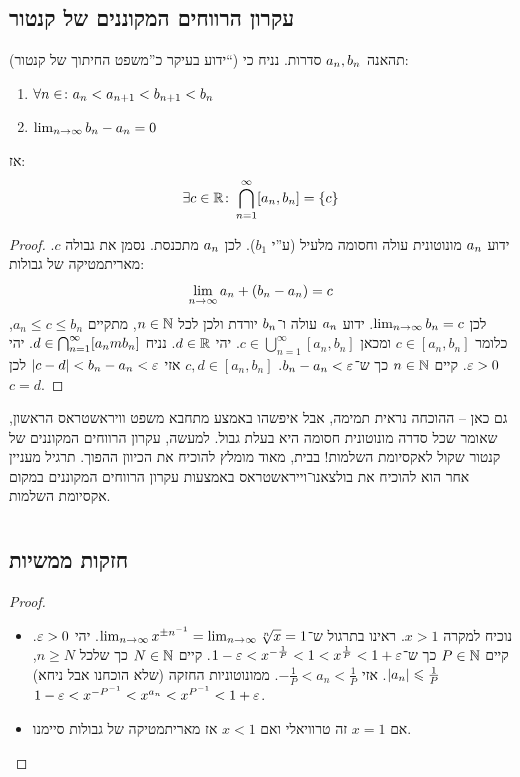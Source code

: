 \documentclass[name=רשימות חשבון דיפרנציאלי ואינטגרלי 1א]{../../../tex/classes/megasumPreamble}
\begin{document}
	\subsection{עקרון הרווחים המקוננים של קנטור}
	(ידוע בעיקר כ''משפט החיתוך של קנטור``)
	תהאנה $a_n, b_n$ סדרות. נניח כי:
	\begin{enumerate}
		\item \hfil $\forall n \in \colon a_n < a_{n + 1} < b_{n + 1} < b_n$
		\item \hfil $\lim_{n \to \infty} b_n - a_n = 0$
	\end{enumerate}
	אז:
	\[ \exists c \in \mathbb{R} \colon \bigcap_{n = 1}^{\infty}[a_n, b_n] = \{c\} \]
	\begin{proof}
		ידוע $a_n$ מונוטונית עולה וחסומה מלעיל (ע''י $b_1$). לכן $a_n$ מתכנסת. נסמן את גבולה $c$. מאריתמטיקה של גבולות:
		\[ \lim_{n \to \infty} a_n + (b_n - a_n) = c \]
		לכן $\lim_{n \to \infty} b_n = c$. ידוע $a_n$ עולה ו־$b_n$ יורדת ולכן לכל $n \in \mathbb{N}$, מתקיים $a_n \le c \le b_n$, כלומר $c \in [a_n, b_n]$ ומכאן $c \in \bigcup_{n = 1}^{\infty} [a_n, b_n]$. יהי $d \in \mathbb{R}$. נניח $d \in \bigcap_{n =1}^{\infty} [a_nm b_n]$. יהי $\eg > 0$. קיים $n \in \mathbb{N}$ כך ש־$b_n - a_n < \eg$. $c, d \in [a_n, b_n]$ אזי $\sof{c - d} < b_n - a_n < \eg$ לכן $c = d$.
	\end{proof}
	גם כאן – ההוכחה נראית תמימה, אבל איפשהו באמצע מתחבא משפט וויראשטראס הראשון, שאומר שכל סדרה מונוטונית חסומה היא בעלת גבול. למעשה, עקרון הרווחים המקוננים של קנטור שקול לאקסיומת השלמות! בבית, מאוד מומלץ להוכיח את הכיוון ההפוך. תרגיל מעניין אחר הוא להוכיח את בולצאנו־וייראשטראס באמצעות עקרון הרווחים המקוננים במקום אקסיומת השלמות.


	\section[הגדרות פונקציות אלמנטריות בעזרת התכנסות]{}
	\subsection{חזקות ממשיות}
	
	\begin{proof}\,
		\begin{itemize}
			\item נוכיח למקרה $x > 1$. ראינו בתרגול ש־$\lim_{n \to \infty} x^{\pm n^{-1}} = \lim_{n \to \infty} \sqrt[n]{x} = 1$. יהי $\eg > 0$. קיים $P \in \mathbb{N}$ כך ש־$1 - \eg < x^{-\frac{1}{P}} < 1 < x^{\frac{1}{P}} < 1 + \eg$. קיים $N \in \mathbb{N}$ כך שלכל $n \ge N$, $\left \lvert a_n \right \rvert \leqslant \frac{1}{P}$. אזי $-\frac{1}{P} < a_n < \frac{1}{P}$. ממונוטוניות החזקה (שלא הוכחנו אבל ניחא) $1 - \eg < x^{-P\op} < x^{a_n} < x^{P\op} < 1 + \eg$.
			\item אם $x = 1$ זה טרוויאלי ואם $x < 1$ אז מאריתמטיקה של גבולות סיימנו.
		\end{itemize}
	\end{proof}
\end{document}
